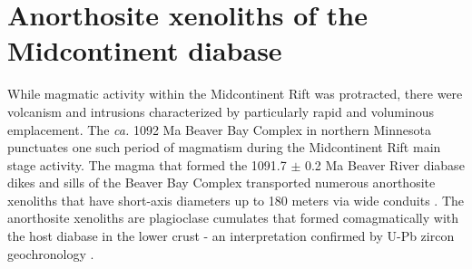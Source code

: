 \documentclass[9pt,twocolumn,twoside,lineno]{pnas-new}
\begin{document}

\section*{Anorthosite xenoliths of the Midcontinent diabase}

While magmatic activity within the Midcontinent Rift was protracted, there were volcanism and intrusions characterized by particularly rapid and voluminous emplacement. The \textit{ca.} 1092 Ma Beaver Bay Complex in northern Minnesota punctuates one such period of magmatism during the Midcontinent Rift main stage activity. The magma that formed the 1091.7 $\pm$ 0.2 Ma Beaver River diabase dikes and sills of the Beaver Bay Complex transported numerous anorthosite xenoliths that have short-axis diameters up to 180 meters via wide conduits \cite{Boerboom2004a, Boerboom2006b}. The anorthosite xenoliths are plagioclase cumulates that formed comagmatically with the host diabase in the lower crust - an interpretation confirmed by U-Pb zircon geochronology \cite{Zhang2021b}. 
\end{document}
